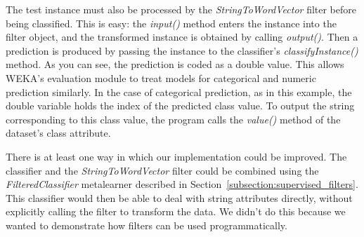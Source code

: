 The test instance must also be processed by the
\textit{StringToWordVector} filter before being classified. This is
easy: the \textit{input()} method enters the instance into the filter
object, and the transformed instance is obtained by calling
\textit{output()}. Then a prediction is produced by passing the
instance to the classifier's \textit{classifyInstance()} method. As
you can see, the prediction is coded as a double value. This allows
WEKA's evaluation module to treat models for categorical and numeric
prediction similarly. In the case of categorical prediction, as in
this example, the double variable holds the index of the predicted
class value. To output the string corresponding to this class value,
the program calls the \textit{value()} method of the dataset's class
attribute.

There is at least one way in which our implementation could be
improved. The classifier and the \textit{StringToWordVector} filter
could be combined using the \textit{FilteredClassifier} metalearner
described in Section~\ref{subsection:supervised_filters}. This
classifier would then be able to deal with string attributes directly,
without explicitly calling the filter to transform the data. We didn't
do this because we wanted to demonstrate how filters can be used
programmatically.

